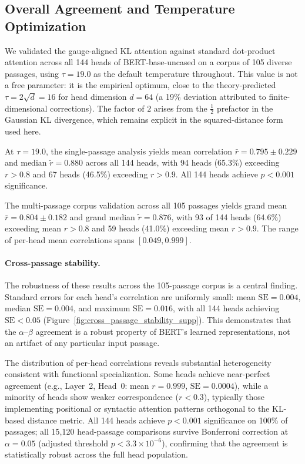 \documentclass[twoside,11pt]{article}
\begin{document}
\subsection{Overall Agreement and Temperature Optimization}

We validated the gauge-aligned KL attention against standard dot-product attention across all 144 heads of BERT-base-uncased on a corpus of 105 diverse passages, using $\tau = 19.0$ as the default temperature throughout. This value is not a free parameter: it is the empirical optimum, close to the theory-predicted $\tau = 2\sqrt{d} = 16$ for head dimension $d = 64$ (a 19\% deviation attributed to finite-dimensional corrections). The factor of $2$ arises from the $\frac{1}{2}$ prefactor in the Gaussian KL divergence, which remains explicit in the squared-distance form used here.

At $\tau = 19.0$, the single-passage analysis yields mean correlation $\bar{r} = 0.795 \pm 0.229$ and median $\tilde{r} = 0.880$ across all 144 heads, with 94 heads (65.3\%) exceeding $r > 0.8$ and 67 heads (46.5\%) exceeding $r > 0.9$. All 144 heads achieve $p < 0.001$ significance.

The multi-passage corpus validation across all 105 passages yields grand mean $\bar{r} = 0.804 \pm 0.182$ and grand median $\tilde{r} = 0.876$, with 93 of 144 heads (64.6\%) exceeding mean $r > 0.8$ and 59 heads (41.0\%) exceeding mean $r > 0.9$. The range of per-head mean correlations spans $[0.049, 0.999]$.

\paragraph{Cross-passage stability.} The robustness of these results across the 105-passage corpus is a central finding. Standard errors for each head's correlation are uniformly small: mean $\mathrm{SE} = 0.004$, median $\mathrm{SE} = 0.004$, and maximum $\mathrm{SE} = 0.016$, with all 144 heads achieving $\mathrm{SE} < 0.05$ (Figure~\ref{fig:cross_passage_stability_supp}). This demonstrates that the $\alpha$--$\beta$ agreement is a robust property of BERT's learned representations, not an artifact of any particular input passage.

The distribution of per-head correlations reveals substantial heterogeneity consistent with functional specialization. Some heads achieve near-perfect agreement (e.g., Layer~2, Head~0: mean $r = 0.999$, $\mathrm{SE} = 0.0004$), while a minority of heads show weaker correspondence ($r < 0.3$), typically those implementing positional or syntactic attention patterns orthogonal to the KL-based distance metric. All 144 heads achieve $p < 0.001$ significance on 100\% of passages; all 15{,}120 head-passage comparisons survive Bonferroni correction at $\alpha = 0.05$ (adjusted threshold $p < 3.3 \times 10^{-6}$), confirming that the agreement is statistically robust across the full head population.
\end{document}
